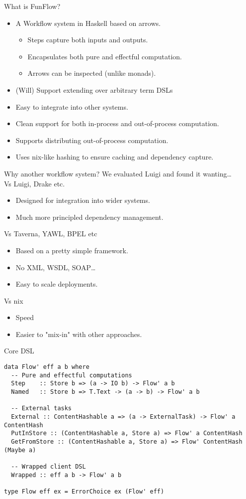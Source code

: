 \documentclass[11pt]{beamer}
\begin{document}
\begin{frame}{What is FunFlow?}
\begin{itemize}
\item A Workflow system in Haskell based on arrows.
\begin{itemize}
\item Steps capture both inputs and outputs.
\item Encapsulates both pure and effectful computation.
\item Arrows can be inspected (unlike monads).
\end{itemize}
\item (Will) Support extending over arbitrary term DSLs
\item Easy to integrate into other systems.
\item Clean support for both in-process and out-of-process computation.
\item Supports distributing out-of-process computation.
\item Uses nix-like hashing to ensure caching and dependency capture.
\end{itemize}
\end{frame}
\begin{frame}{Why another workflow system?}
We evaluated Luigi and found it wanting\dots \\
\pause
Vs Luigi, Drake etc.
\begin{itemize}
\item Designed for integration into wider systems.
\item Much more principled dependency management.
\end{itemize}
\pause
Vs Taverna, YAWL, BPEL etc
\begin{itemize}
\item Based on a pretty simple framework.
\item No XML, WSDL, SOAP\dots
\item Easy to scale deployments.
\end{itemize}
\pause
Vs nix
\begin{itemize}
\item Speed
\item Easier to "mix-in" with other approaches.
\end{itemize}
\end{frame}

\begin{frame}[fragile]{Core DSL}
\begin{lstlisting}[basicstyle=\tiny]
data Flow' eff a b where
  -- Pure and effectful computations
  Step    :: Store b => (a -> IO b) -> Flow' a b
  Named   :: Store b => T.Text -> (a -> b) -> Flow' a b

  -- External tasks
  External :: ContentHashable a => (a -> ExternalTask) -> Flow' a ContentHash
  PutInStore :: (ContentHashable a, Store a) => Flow' a ContentHash
  GetFromStore :: (ContentHashable a, Store a) => Flow' ContentHash (Maybe a)

  -- Wrapped client DSL
  Wrapped :: eff a b -> Flow' a b

type Flow eff ex = ErrorChoice ex (Flow' eff)
\end{lstlisting}
\end{frame}
\end{document}
